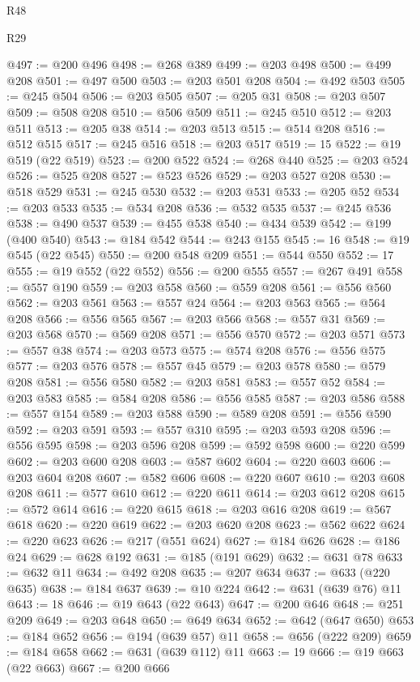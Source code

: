 \begin{lexlean}{R48}
\begin{lexlean}{R29}
\begin{coremodule}
{{{{{{{{{{{{{{{{{{{{{{{{{{{{{{{{{{{{{{{{{{{{{{{{{{{{{{{{{{{{{{{{{{{{{{{{{{{{{{{{{{{{{{{{{{{{{{{{{{{{{{{{{{{{{{{{{{{{{{{{{{{{{{{{{{{{{{{{{{{{{{{{{{{{{{{{{{{{{{{{{{{{{{{{{{{{{{{{{{{{{{{{{{{{{{{{{{{{{{{{{{{{{{{{{{{{{{{{{{@497 := @200 @496
@498 := @268 @389
@499 := @203 @498
@500 := @499 @208
@501 := @497 @500
@503 := @203 @501 @208
@504 := @492 @503
@505 := @245 @504
@506 := @203 @505
@507 := @205 @31
@508 := @203 @507
@509 := @508 @208
@510 := @506 @509
@511 := @245 @510
@512 := @203 @511
@513 := @205 @38
@514 := @203 @513
@515 := @514 @208
@516 := @512 @515
@517 := @245 @516
@518 := @203 @517
@519 := 15
@522 := @19 @519 (@22 @519)
@523 := @200 @522
@524 := @268 @440
@525 := @203 @524
@526 := @525 @208
@527 := @523 @526
@529 := @203 @527 @208
@530 := @518 @529
@531 := @245 @530
@532 := @203 @531
@533 := @205 @52
@534 := @203 @533
@535 := @534 @208
@536 := @532 @535
@537 := @245 @536
@538 := @490 @537
@539 := @455 @538
@540 := @434 @539
@542 := @199 (@400 @540)
@543 := @184 @542
@544 := @243 @155
@545 := 16
@548 := @19 @545 (@22 @545)
@550 := @200 @548 @209
@551 := @544 @550
@552 := 17
@555 := @19 @552 (@22 @552)
@556 := @200 @555
@557 := @267 @491
@558 := @557 @190
@559 := @203 @558
@560 := @559 @208
@561 := @556 @560
@562 := @203 @561
@563 := @557 @24
@564 := @203 @563
@565 := @564 @208
@566 := @556 @565
@567 := @203 @566
@568 := @557 @31
@569 := @203 @568
@570 := @569 @208
@571 := @556 @570
@572 := @203 @571
@573 := @557 @38
@574 := @203 @573
@575 := @574 @208
@576 := @556 @575
@577 := @203 @576
@578 := @557 @45
@579 := @203 @578
@580 := @579 @208
@581 := @556 @580
@582 := @203 @581
@583 := @557 @52
@584 := @203 @583
@585 := @584 @208
@586 := @556 @585
@587 := @203 @586
@588 := @557 @154
@589 := @203 @588
@590 := @589 @208
@591 := @556 @590
@592 := @203 @591
@593 := @557 @310
@595 := @203 @593 @208
@596 := @556 @595
@598 := @203 @596 @208
@599 := @592 @598
@600 := @220 @599
@602 := @203 @600 @208
@603 := @587 @602
@604 := @220 @603
@606 := @203 @604 @208
@607 := @582 @606
@608 := @220 @607
@610 := @203 @608 @208
@611 := @577 @610
@612 := @220 @611
@614 := @203 @612 @208
@615 := @572 @614
@616 := @220 @615
@618 := @203 @616 @208
@619 := @567 @618
@620 := @220 @619
@622 := @203 @620 @208
@623 := @562 @622
@624 := @220 @623
@626 := @217 (@551 @624)
@627 := @184 @626
@628 := @186 @24
@629 := @628 @192
@631 := @185 (@191 @629)
@632 := @631 @78
@633 := @632 @11
@634 := @492 @208
@635 := @207 @634
@637 := @633 (@220 @635)
@638 := @184 @637
@639 := @10 @224
@642 := @631 (@639 @76) @11
@643 := 18
@646 := @19 @643 (@22 @643)
@647 := @200 @646
@648 := @251 @209
@649 := @203 @648
@650 := @649 @634
@652 := @642 (@647 @650)
@653 := @184 @652
@656 := @194 (@639 @57) @11
@658 := @656 (@222 @209)
@659 := @184 @658
@662 := @631 (@639 @112) @11
@663 := 19
@666 := @19 @663 (@22 @663)
@667 := @200 @666
}}}}}}}}}}}}}}}}}}}}}}}}}}}}}}}}}}}}}}}}}}}}}}}}}}}}}}}}}}}}}}}}}}}}}}}}}}}}}}}}}}}}}}}}}}}}}}}}}}}}}}}}}}}}}}}}}}}}}}}}}}}}}}}}}}}}}}}}}}}}}}}}}}}}}}}}}}}}}}}}}}}}}}}}}}}}}}}}}}}}}}}}}}}}}}}}}}}}}}}}}}}}}}}}}}}}}}}}}}
\end{coremodule}
\end{lexlean}
\end{lexlean}
